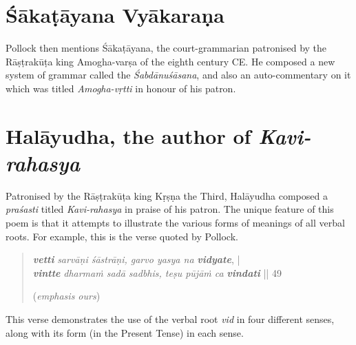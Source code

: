 \section{Śākaṭāyana Vyākaraṇa}\label{chap3-sec13}

Pollock then mentions Śākaṭāyana,  the court-grammarian patronised by the Rāṣṭrakūṭa king Amogha-varṣa of the eighth century CE. He composed a new system of grammar called the {\sl Śabdānuśāsana}, and also an auto-commentary on it which was titled {\sl Amogha-vṛtti} in honour of his patron.\\[-19pt] 

\section{Halāyudha, the author of {\sl\bfseries Kavi-rahasya}}\label{chap3-sec14}

Patronised by the Rāṣṭrakūṭa king Kṛṣṇa the Third, Halāyudha composed a {\sl praśasti} titled {\sl Kavi-rahasya} in praise of his patron. The unique feature of this poem is that it attempts to illustrate the various forms of meanings of all verbal roots. For example, this is the verse quoted by Pollock.\\[-19pt] 
\begin{quote}
{{\sl\bfseries vetti} {\sl sarvāṇi śāstrāṇi, garvo yasya na} {\sl\bfseries vidyate},} |\\
{{\sl\bfseries vintte} {\sl dharmaṁ sadā sadbhis, teṣu pūjāṁ ca} {\sl\bfseries vindati}} || 49 

\hfill ({\sl emphasis ours})
\end{quote}
This verse demonstrates the use of the verbal root {\sl vid} in four different senses, along with its form (in the Present Tense) in each sense.

